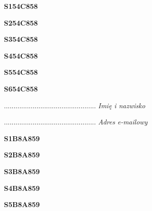 \begin{turn}{90}\huge \textbf{S154C858}\end{turn}

\begin{turn}{90}\huge \textbf{S254C858}\end{turn}

\begin{turn}{90}\huge \textbf{S354C858}\end{turn}

\begin{turn}{90}\huge \textbf{S454C858}\end{turn}

\begin{turn}{90}\huge \textbf{S554C858}\end{turn}

\begin{turn}{90}\huge \textbf{S654C858}\end{turn}

\begin{turn}{90}\begin{minipage}{\linewidth} \vspace{20mm} ................................................  \textit{Imię i nazwisko}\end{minipage}\end{turn}

\begin{turn}{90}\begin{minipage}{\linewidth} \vspace{20mm} ................................................  \textit{Adres e-mailowy}\end{minipage}\end{turn}

\begin{turn}{90}\huge \textbf{S1B8A859}\end{turn}

\begin{turn}{90}\huge \textbf{S2B8A859}\end{turn}

\begin{turn}{90}\huge \textbf{S3B8A859}\end{turn}

\begin{turn}{90}\huge \textbf{S4B8A859}\end{turn}

\begin{turn}{90}\huge \textbf{S5B8A859}\end{turn}

